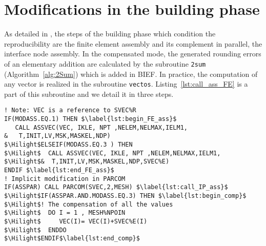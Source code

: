 \section{Modifications in the building phase }
\label{sec:build_implement}
%
As detailed in \cite{LaND16}, the steps of the building 
phase which condition the reproducibility 
are the finite element assembly and its complement in parallel,  
the interface node assembly.
In the compensated mode, the generated rounding errors of an elementary 
addition are calculated by the subroutine \texttt{2sum} 
(Algorithm~\ref{alg:2Sum}) which is added in BIEF.
In practice, the computation of any vector
is realized in the subroutine \texttt{vectos}. 
Listing~\ref{lst:call_ass_FE} is a part of this subroutine and 
we detail it in three steps.
%
\begin{lstlisting}[language=TelFortran, caption={The call of the FE assembly under the two modes of the computation in \texttt{vectos}},label={lst:call_ass_FE},escapechar=\$]
! Note: VEC is a reference to SVEC%R
IF(MODASS.EQ.1) THEN $\label{lst:begin_FE_ass}$ 
   CALL ASSVEC(VEC, IKLE, NPT ,NELEM,NELMAX,IELM1,
&   T,INIT,LV,MSK,MASKEL,NDP)
$\Hilight$ELSEIF(MODASS.EQ.3 ) THEN
$\Hilight$  CALL ASSVEC(VEC, IKLE, NPT ,NELEM,NELMAX,IELM1,
$\Hilight$&  T,INIT,LV,MSK,MASKEL,NDP,SVEC%E) 
ENDIF $\label{lst:end_FE_ass}$
! Implicit modification in PARCOM
IF(ASSPAR) CALL PARCOM(SVEC,2,MESH) $\label{lst:call_IP_ass}$ 
$\Hilight$IF(ASSPAR.AND.MODASS.EQ.3) THEN $\label{lst:begin_comp}$
$\Hilight$! The compensation of all the values
$\Hilight$  DO I = 1 , MESH%NPOIN
$\Hilight$     VEC(I)= VEC(I)+SVEC%E(I)
$\Hilight$  ENDDO  
$\Hilight$ENDIF$\label{lst:end_comp}$
\end{lstlisting}
%
